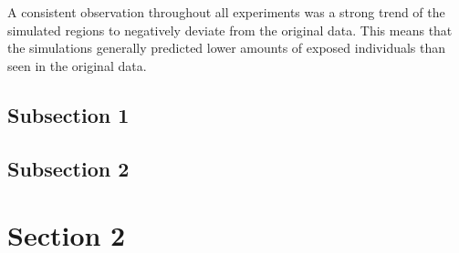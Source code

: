 A consistent observation throughout all experiments was a strong trend of the simulated regions to negatively deviate from the
original data. This means that the simulations generally predicted lower amounts of exposed individuals than seen in the original
data.



\subsection{Subsection 1}



\subsection{Subsection 2}


\section{Section 2}

